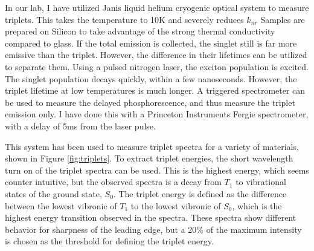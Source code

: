 \documentclass[../thesis.tex]{subfiles}
\begin{document}
In our lab, I have utilized Janis liquid helium cryogenic optical system to measure triplets.
This takes the temperature to 10K and severely reduces $k_{nr}$
Samples are prepared on Silicon to take advantage of the strong thermal conductivity compared to glass.
If the total emission is collected, the singlet still is far more emissive than the triplet.
However, the difference in their lifetimes can be utilized to separate them.
Using a pulsed nitrogen laser, the exciton population is excited. 
The singlet population decays quickly, within a few nanoseconds.
However, the triplet lifetime at low temperatures is much longer.
A triggered spectrometer can be used to measure the delayed phosphorescence, and thus measure the triplet emission only.
I have done this with a Princeton Instruments Fergie spectrometer, with a delay of 5ms from the laser pulse.

This system has been used to measure triplet spectra for a variety of materials, shown in Figure \ref{fig:triplets}.
To extract triplet energies, the short wavelength turn on of the triplet spectra can be used.  
This is the highest energy, which seems counter intuitive, but the observed spectra is a decay from $T_1$ to vibrational states of the ground state, $S_0$. 
The triplet energy is defined as the difference between the lowest vibronic of $T_1$ to the lowest vibronic of $S_0$, which is the highest energy transition observed in the spectra.
These spectra show different behavior for sharpness of the leading edge, but a 20\% of the maximum intensity is chosen as the threshold for defining the triplet energy.


\end{document}
